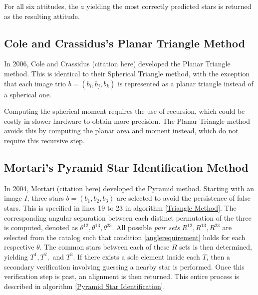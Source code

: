 For all six attitudes, the $a$ yielding the most correctly predicted stars is returned as the resulting attitude.

\subsection{Cole and Crassidus's Planar Triangle Method}
In 2006, Cole and Crassidus (citation here) developed the Planar Triangle method. This is identical to their Spherical Triangle method, with the exception that each image trio $b = (b_i, b_j, b_k)$ is represented as a planar triangle instead of a spherical one. 

Computing the spherical moment requires the use of recursion, which could be costly in slower hardware to obtain more precision. The Planar Triangle method avoids this by computing the planar area and moment instead, which do not require this recursive step.

\subsection{Mortari's Pyramid Star Identification Method}
In 2004, Mortari (citation here) developed the Pyramid method. Starting with an image $I$, three stars $b = (b_1, b_2, b_3)$ are selected to avoid the persistence of false stars. This is specified in lines 19 to 23 in algorithm \eqref{Triangle Method}. The corresponding angular separation between each distinct permutation of the three is computed, denoted as $\theta^{12}, \theta^{13}, \theta^{23}$. All possible \textit{pair sets} $R^{12}, R^{13}, R^{23}$ are selected from the catalog such that condition \eqref{anglerequirement} holds for each respective $\theta$. The common stars between each of these $R$ sets is then determined, yielding $T^1, T^2, $ and $T^3$. If there exists a sole element inside each $T$, then a secondary verification involving guessing a nearby star is performed. Once this verification step is past, an alignment is then returned. This entire process is described in algorithm \eqref{Pyramid Star Identification}.

